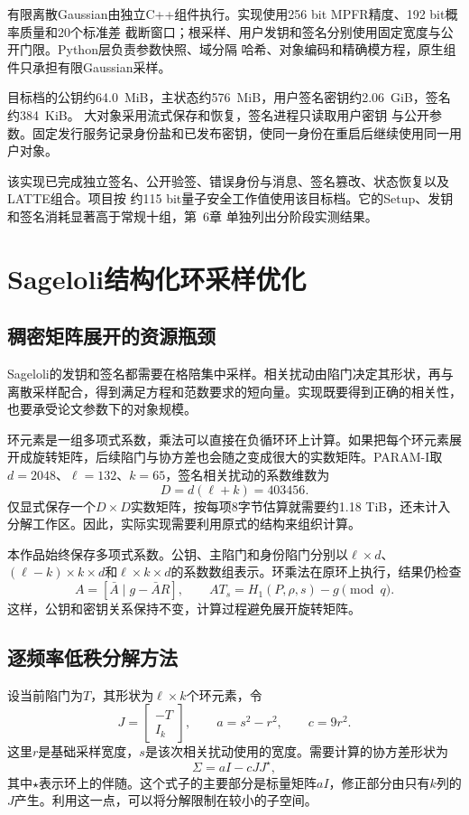 有限离散Gaussian由独立C++组件执行。实现使用256 bit MPFR精度、192 bit概率质量和20个标准差
截断窗口；根采样、用户发钥和签名分别使用固定宽度与公开门限。Python层负责参数快照、域分隔
哈希、对象编码和精确模方程，原生组件只承担有限Gaussian采样。

目标档的公钥约64.0~MiB，主状态约576~MiB，用户签名密钥约2.06~GiB，签名约384~KiB。
大对象采用流式保存和恢复，签名进程只读取用户密钥
与公开参数。固定发行服务记录身份盐和已发布密钥，使同一身份在重启后继续使用同一用户对象。

该实现已完成独立签名、公开验签、错误身份与消息、签名篡改、状态恢复以及LATTE组合。项目按
约115 bit量子安全工作值使用该目标档。它的Setup、发钥和签名消耗显著高于常规十组，第~6章
单独列出分阶段实测结果。

\section{Sageloli结构化环采样优化}
\subsection{稠密矩阵展开的资源瓶颈}
Sageloli的发钥和签名都需要在格陪集中采样。相关扰动由陷门决定其形状，再与离散采样配合，得到满足方程和范数要求的短向量。实现既要得到正确的相关性，也要承受论文参数下的对象规模。

环元素是一组多项式系数，乘法可以直接在负循环环上计算。如果把每个环元素展开成旋转矩阵，后续陷门与协方差也会随之变成很大的实数矩阵。PARAM-I取$d=2048$、$\ell=132$、$k=65$，签名相关扰动的系数维数为
\[
 D=d(\ell+k)=403456.
\]
仅显式保存一个$D\times D$实数矩阵，按每项8字节估算就需要约1.18 TiB，还未计入分解工作区。因此，实际实现需要利用原式的结构来组织计算。

本作品始终保存多项式系数。公钥、主陷门和身份陷门分别以$\ell\times d$、$(\ell-k)\times k\times d$和$\ell\times k\times d$的系数数组表示。环乘法在原环上执行，结果仍检查
\[
 A=[\bar A\mid g-\bar AR],\qquad AT_s=H_1(P,\rho,s)-g\pmod q.
\]
这样，公钥和密钥关系保持不变，计算过程避免展开旋转矩阵。

\subsection{逐频率低秩分解方法}
设当前陷门为$T$，其形状为$\ell\times k$个环元素，令
\[
 J=\begin{bmatrix}-T\\I_k\end{bmatrix},\qquad
 a=s^2-r^2,\qquad c=9r^2.
\]
这里$r$是基础采样宽度，$s$是该次相关扰动使用的宽度。需要计算的协方差形状为
\[
 \Sigma=aI-cJJ^\star,
\]
其中$\star$表示环上的伴随。这个式子的主要部分是标量矩阵$aI$，修正部分由只有$k$列的$J$产生。利用这一点，可以将分解限制在较小的子空间。


